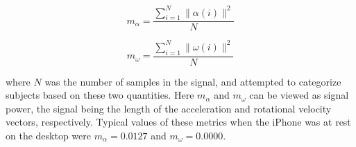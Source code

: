 \begin{equation}
m_{\alpha} = \frac{\sum_{i=1}^{N} \|\alpha(i)\|^{2} }{N}
\end{equation}

\begin{equation}
m_{\omega} = \frac{\sum_{i=1}^{N} \|\omega(i)\|^{2} }{N}
\end{equation}

where $N$ was the number of samples in the signal, and attempted to categorize subjects based on these two quantities. Here $m_{\alpha}$ and $m_{\omega}$ can be viewed as signal power, the signal being the length of the acceleration and rotational velocity vectors, respectively. Typical values of these metrics when the iPhone was at rest on the desktop were $m_{\alpha}=0.0127$ and  $m_{\omega}=0.0000$.

